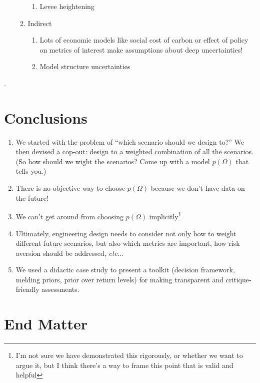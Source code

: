 \documentclass[12pt]{article}
\makeatletter
\DeclareRobustCommand\onedot{\futurelet\@let@token\@onedot}
\def\@onedot{\ifx\@let@token.\else.\null\fi\xspace}
\def\etc{\emph{etc}\onedot} \def\vs{\emph{vs}\onedot}
\DeclareRobustCommand\onedot{\futurelet\@let@token\@onedot}
\def\@onedot{\ifx\@let@token.\else.\null\fi\xspace}
\def\etc{\emph{etc}\onedot} \def\vs{\emph{vs}\onedot}
\makeatother
\begin{document}
\begin{enumerate}
\begin{enumerate}
\begin{enumerate}
                        \item Levee heightening \citep{garner_slrise:2018,oddo_coastal:2017,vandantzig_dike:1956}
                    \end{enumerate}
              \item Indirect
                    \begin{enumerate}
                        \item Lots of economic models like social cost of carbon or effect of policy on metrics of interest make assumptions about deep uncertainties!
                        \item Model structure uncertainties
                    \end{enumerate}
          \end{enumerate}
\end{enumerate}.

\section{Conclusions}

\begin{enumerate}
    \item We started with the problem of ``which scenario should we design to?'' We then devised a cop-out: design to a weighted combination of all the scenarios. (So how should we wight the scenarios? Come up with a model $p(\Omega)$ that tells you.)
    \item There is no objective way to choose $p(\Omega)$ because we don't have data on the future!
    \item We can't get around from choosing $p(\Omega)$ implicitly\footnote{I'm not sure we have demonstrated this rigorously, or whether we want to argue it, but I think there's a way to frame this point that is valid and helpful}
    \item Ultimately, engineering design needs to consider not only how to weight different future scenarios, but also which metrics are important, how risk aversion should be addressed, \etc.
    \item We used a didactic case study to present a toolkit (decision framework, melding priors, prior over return levels) for making transparent and critique-friendly assessments.
\end{enumerate}

\section*{End Matter}
\end{document}
